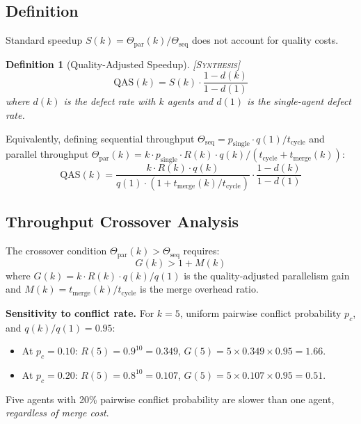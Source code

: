 \documentclass[11pt, a4paper, copyright]{googledeepmind}
\newtheorem{definition}{Definition}[section]
\newcommand{\synthesis}{\textsc{[Synthesis]}}
\begin{document}
\subsection{Definition}

Standard speedup $S(k) = \Theta_{\mathrm{par}}(k) / \Theta_{\mathrm{seq}}$ does not account for quality costs.

\begin{definition}[Quality-Adjusted Speedup] \synthesis{}
\label{def:qas}
\begin{equation}
\label{eq:qas}
  \mathrm{QAS}(k) = S(k) \cdot \frac{1 - d(k)}{1 - d(1)}
\end{equation}
where $d(k)$ is the defect rate with $k$ agents and $d(1)$ is the single-agent defect rate.
\end{definition}

Equivalently, defining sequential throughput $\Theta_{\mathrm{seq}} = p_{\mathrm{single}} \cdot q(1) / t_{\mathrm{cycle}}$ and parallel throughput $\Theta_{\mathrm{par}}(k) = k \cdot p_{\mathrm{single}} \cdot R(k) \cdot q(k) / (t_{\mathrm{cycle}} + t_{\mathrm{merge}}(k))$:
\begin{equation}
  \mathrm{QAS}(k) = \frac{k \cdot R(k) \cdot q(k)}{q(1) \cdot (1 + t_{\mathrm{merge}}(k)/t_{\mathrm{cycle}})} \cdot \frac{1 - d(k)}{1 - d(1)}
\end{equation}

\subsection{Throughput Crossover Analysis}

The crossover condition $\Theta_{\mathrm{par}}(k) > \Theta_{\mathrm{seq}}$ requires:
\begin{equation}
  G(k) > 1 + M(k)
\end{equation}
where $G(k) = k \cdot R(k) \cdot q(k)/q(1)$ is the quality-adjusted parallelism gain and $M(k) = t_{\mathrm{merge}}(k)/t_{\mathrm{cycle}}$ is the merge overhead ratio.

\textbf{Sensitivity to conflict rate.}
For $k = 5$, uniform pairwise conflict probability $p_c$, and $q(k)/q(1) = 0.95$:
\begin{itemize}[nosep]
  \item At $p_c = 0.10$: $R(5) = 0.9^{10} = 0.349$, $G(5) = 5 \times 0.349 \times 0.95 = 1.66$.
  \item At $p_c = 0.20$: $R(5) = 0.8^{10} = 0.107$, $G(5) = 5 \times 0.107 \times 0.95 = 0.51$.
\end{itemize}
Five agents with 20\% pairwise conflict probability are slower than one agent, \emph{regardless of merge cost}.
\end{document}
